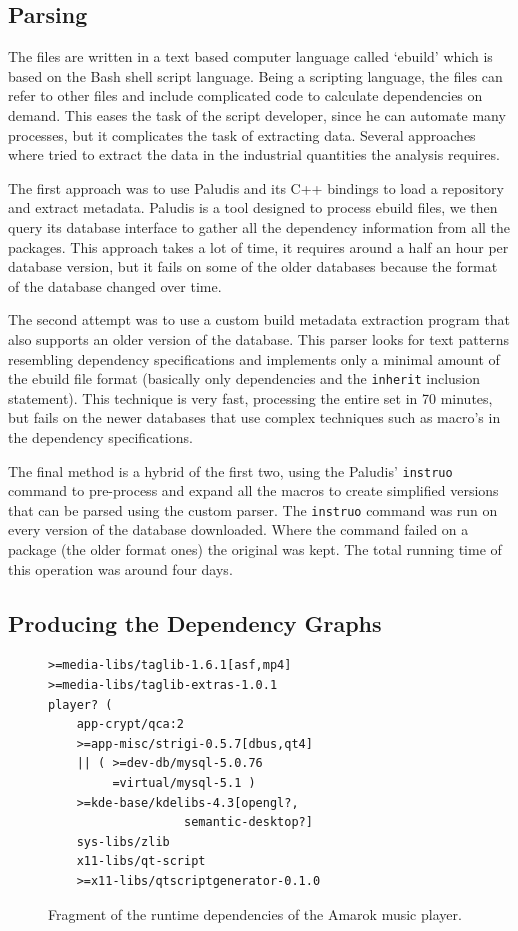 \documentclass[smallextended,final]{svjour3}
\begin{document}
\subsection{Parsing}

The files are written in a text based computer language called `ebuild' which is based on the Bash shell script language. Being a scripting language, the files can refer to other files and include complicated code to calculate dependencies on demand. This eases the task of the script developer, since he can automate many processes, but it complicates the task of extracting data. Several approaches where tried to extract the data in the industrial quantities the analysis requires.

The first approach was to use Paludis and its C++ bindings to load a repository and extract metadata. Paludis is a tool designed to process ebuild files, we then query its database interface to gather all the dependency information from all the packages. This approach takes a lot of time, it requires around a half an hour per database version, but it fails on some of the older databases because the format of the database changed over time.

The second attempt was to use a custom build metadata extraction program that also supports an older version of the database. This parser looks for text patterns resembling dependency specifications and implements only a minimal amount of the ebuild file format (basically only dependencies and the \verb|inherit| inclusion statement). This technique is very fast, processing the entire set in 70 minutes, but fails on the newer databases that use complex techniques such as macro's in the dependency specifications.

The final method is a hybrid of the first two, using the Paludis' \verb|instruo| command to pre-process and expand all the macros to create simplified versions that can be parsed using the custom parser. The \verb|instruo| command was run on every version of the database downloaded. Where the command failed on a package (the older format ones) the original was kept. The total running time of this operation was around four days.

\subsection{Producing the Dependency Graphs}

\begin{figure}
\small\centering
\begin{BVerbatim}
>=media-libs/taglib-1.6.1[asf,mp4]
>=media-libs/taglib-extras-1.0.1
player? (
    app-crypt/qca:2
    >=app-misc/strigi-0.5.7[dbus,qt4]
    || ( >=dev-db/mysql-5.0.76
         =virtual/mysql-5.1 )
    >=kde-base/kdelibs-4.3[opengl?,
                   semantic-desktop?]
    sys-libs/zlib
    x11-libs/qt-script
    >=x11-libs/qtscriptgenerator-0.1.0
\end{BVerbatim}
\caption{Fragment of the runtime dependencies of the Amarok music player.}\label{fig:amarokruntime}
\end{figure}
\end{document}
